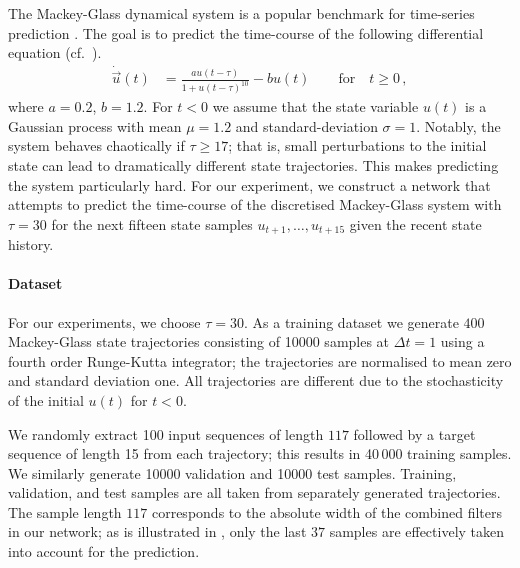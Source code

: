 The Mackey-Glass dynamical system \citep{mackey1977oscillation} is a popular benchmark for time-series prediction \citep[cf.][Section 4.3.1]{mendel2017uncertain}.
The goal is to predict the time-course of the following differential equation (cf.~).
\begin{align*}
	\dot{\vec u}(t) &= \frac{a u(t - \tau)}{1 + u(t - \tau)^{10}} - b u(t) \quad\quad \text{for} \quad t \geq 0\,,
\end{align*}
where $a = 0.2$, $b = 1.2$.
For $t < 0$ we assume that the state variable $u(t)$ is a Gaussian process with mean $\mu = 1.2$ and standard-deviation $\sigma = 1$.
Notably, the system behaves chaotically if $\tau \geq 17$; that is, small perturbations to the initial state can lead to dramatically different state trajectories.
This makes predicting the system particularly hard.
For our experiment, we construct a network that attempts to predict the time-course of the discretised Mackey-Glass system with $\tau = 30$ for the next fifteen state samples $u_{t + 1}, \ldots, u_{t + 15}$ given the recent state history.

\paragraph{Dataset}
For our experiments, we choose $\tau = 30$.
As a training dataset we generate $400$ Mackey-Glass state trajectories consisting of \num{10000} samples at $\Delta t = 1$ using a fourth order Runge-Kutta integrator; the trajectories are normalised to mean zero and standard deviation one.
All trajectories are different due to the stochasticity of the initial $u(t)$ for $t < 0$.

We randomly extract 100 input sequences of length $117$ followed by a target sequence of length 15 from each trajectory; this results in 40\,000 training samples. We similarly generate \num{10000} validation and \num{10000} test samples.
Training, validation, and test samples are all taken from separately generated trajectories.
The sample length $117$ corresponds to the absolute width of the combined \FIR filters in our network; as is illustrated in , only the last $37$ samples are effectively taken into account for the prediction.

